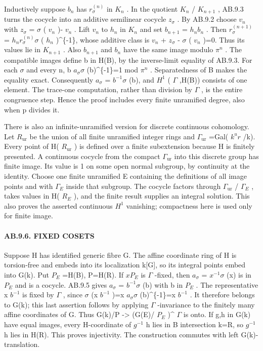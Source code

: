 \documentclass[
  11pt,
]{article}
\begin{document}
Inductively suppose \(b_{n}\) has \(r^{(n)}_{\sigma}\) in \(K_{n}\) . In
the quotient \(K_{n}\) / \(K_{n+1}\) , AB.9.3 turns the cocycle into an
additive semilinear cocycle \(z_{\sigma}\) . By AB.9.2 choose \(v_{n}\)
with \(z_{\sigma}\) = \(\sigma\) ( \(v_{n}\) )- \(v_{n}\) . Lift
\(v_{n}\) to \(h_{n}\) in \(K_{n}\) and set \(b_{n+1}\) =
\(h_{n} b_{n}\) . Then \(r^{(n+1)}_{\sigma}\) =
\(h_{n} r^{(n)}_{\sigma} \sigma\) ( \(h_{n}\) )\^{}\{-1\}, whose
additive class is \(v_{n}\) + \(z_{\sigma}\) - \(\sigma\) ( \(v_{n}\)
)=0. Thus its values lie in \(K_{n+1}\) . Also \(b_{n+1}\) and \(b_{n}\)
have the same image modulo \(\pi^n\) . The compatible images define b in
H(B), by the inverse-limit equality of AB.9.3. For each \(\sigma\) and
every n, b \(a_{\sigma} \sigma\) (b)\^{}\{-1\}=1 mod \(\pi^n\) .
Separatedness of B makes the equality exact. Consequently \(a_{\sigma}\)
= \(b^{-1} \sigma\) (b), and \(H^1\) ( \(\Gamma\) ,H(B)) consists of one
element. The trace-one computation, rather than division by \textbar{}
\(\Gamma\) \textbar, is the entire congruence step. Hence the proof
includes every finite unramified degree, also when p divides it.

There is also an infinite-unramified version for discrete continuous
cohomology. Let \(R_{\mathrm{ur}}\) be the union of all finite
unramified integer rings and \(\Gamma_{\mathrm{ur}}\) =Gal( \(k^ur\)
/k). Every point of H( \(R_{\mathrm{ur}}\) ) is defined over a finite
subextension because H is finitely presented. A continuous cocycle from
the compact \(\Gamma_{\mathrm{ur}}\) into this discrete group has finite
image. Its value is 1 on some open normal subgroup, by continuity at the
identity. Choose one finite unramified E containing the definitions of
all image points and with \(\Gamma_{E}\) inside that subgroup. The
cocycle factors through \(\Gamma_{\mathrm{ur}}\) / \(\Gamma_{E}\) ,
takes values in H( \(R_{E}\) ), and the finite result supplies an
integral solution. This also proves the asserted continuous \(H^1\)
vanishing; compactness here is used only for finite image.

\paragraph{AB.9.6. FIXED COSETS}\label{ab.9.6.-fixed-cosets}

Suppose H has identified generic fibre G. The affine coordinate ring of
H is torsion-free and embeds into its localization k{[}G{]}, so its
integral points embed into G(k). Put \(P_{E}\) =H(B), P=H(R). If
\(xP_{E}\) is \(\Gamma\) -fixed, then \(a_{\sigma}\) = \(x^{-1} \sigma\)
(x) is in \(P_{E}\) and is a cocycle. AB.9.5 gives \(a_{\sigma}\) =
\(b^{-1} \sigma\) (b) with b in \(P_{E}\) . The representative x
\(b^{-1}\) is fixed by \(\Gamma\) , since \(\sigma\) (x \(b^{-1}\) )=x
\(a_{\sigma} \sigma\) (b)\^{}\{-1\}=x \(b^{-1}\) . It therefore belongs
to G(k); this last assertion follows by applying \(\Gamma\) -invariance
to the finitely many affine coordinates of G. Thus G(k)/P
-\textgreater{} (G(E)/ \(P_{E}\) )\^{} \(\Gamma\) is onto. If g,h in
G(k) have equal images, every H-coordinate of \(g^{-1}\) h lies in B
intersection k=R, so \(g^{-1}\) h lies in H(R). This proves injectivity.
The construction commutes with left G(k)-translation.
\end{document}
